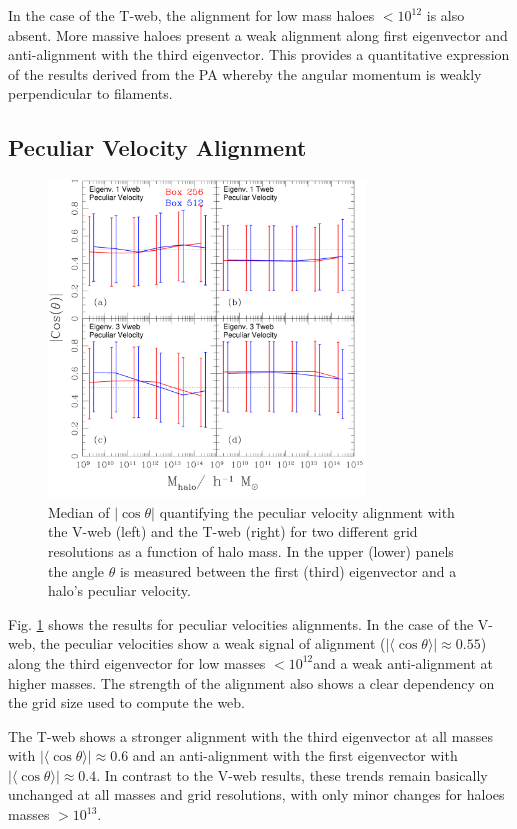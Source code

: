 \documentclass[useAMS,usenatbib]{mn2e}
\newcommand{\hMsun}{{\ifmmode{h^{-1}{\rm
        {M_{\odot}}}}\else{$h^{-1}{\rm{M_{\odot}}}$~}\fi}}
\newcommand{\Msun}{{\ifmmode{{\rm {M_{\odot}}}}\else{${\rm{M_{\odot}}}$}\fi}}
\newcommand{\muavg}{\vert\langle\cos\theta\rangle\vert}
\begin{document}
In the case of the T-web, the alignment for low mass haloes $<10^{12}$\hMsun
is also absent. More massive haloes present a weak alignment along
first eigenvector and anti-alignment with the third eigenvector. This
provides a quantitative expression of the results derived from the
PA whereby the angular momentum is weakly
perpendicular to filaments.

\subsection{Peculiar Velocity Alignment}

\begin{figure}
\includegraphics[width=0.75\textwidth]{Fig4.pdf}
\caption{Median of $\vert\cos\theta\vert$ quantifying the peculiar velocity
  alignment with the V-web (left) and the T-web (right) for two different
  grid resolutions as a function of halo mass. In the upper (lower)
  panels the angle $\theta$ is measured between the first (third)
  eigenvector and a halo's peculiar velocity.
\label{fig:velocity_alignment}}
\end{figure}

Fig. \ref{fig:velocity_alignment} shows the results for peculiar
velocities alignments. In the case of the V-web, the peculiar
velocities show a weak signal of alignment ($\muavg\approx0.55$)
along the third eigenvector for low masses $<10^{12}$\Msun and a weak
anti-alignment at higher masses. The strength of the alignment also shows
a clear dependency on the grid size used to compute the web.

The T-web shows a stronger alignment with the third eigenvector at all
masses with $\muavg\approx0.6$ and an anti-alignment with the first
eigenvector with $\muavg\approx 0.4$. In contrast to the V-web results,
these trends remain basically unchanged at all masses and grid
resolutions, with only minor changes for haloes masses $>10^{13}$\hMsun.
\end{document}
